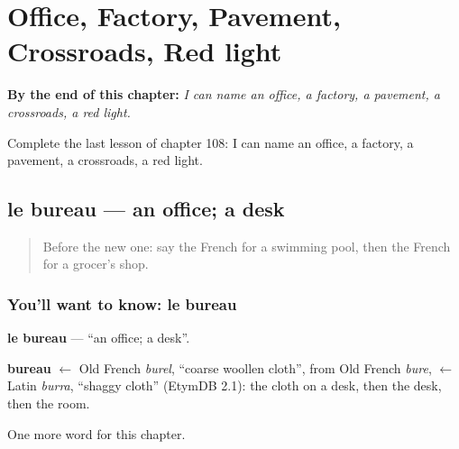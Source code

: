 
\chapter{Office, Factory, Pavement, Crossroads, Red light}
\label{ch:fr-office-factory-pavement-crossroads-red-light}

\begin{chapteropening}
\textbf{By the end of this chapter:} \emph{I can name an office, a factory, a pavement, a crossroads, a red light.}

Complete the last lesson of chapter 108: I can name an office, a factory, a pavement, a crossroads, a red light.
\end{chapteropening}

\section[le bureau]{le bureau — an office; a desk}

\label{lesson:FR-C108-bureau}



\begin{quote}
Before the new one: say the French for a swimming pool, then the French for a grocer's shop.
\end{quote}

\subsection*{You'll want to know: le bureau}
\textbf{le bureau} — \textquotedblleft{}an office; a desk\textquotedblright{}.

\begin{cousinweb}
\textbf{bureau} $\leftarrow$ Old French \emph{burel}, \textquotedblleft{}coarse woollen cloth\textquotedblright{}, from Old French \emph{bure}, $\leftarrow$ Latin \emph{burra}, \textquotedblleft{}shaggy cloth\textquotedblright{} (EtymDB 2.1): the cloth on a desk, then the desk, then the room.
\end{cousinweb}

\begin{grammarlens}[title={What you've built}]
One more word for this chapter.
\end{grammarlens}

